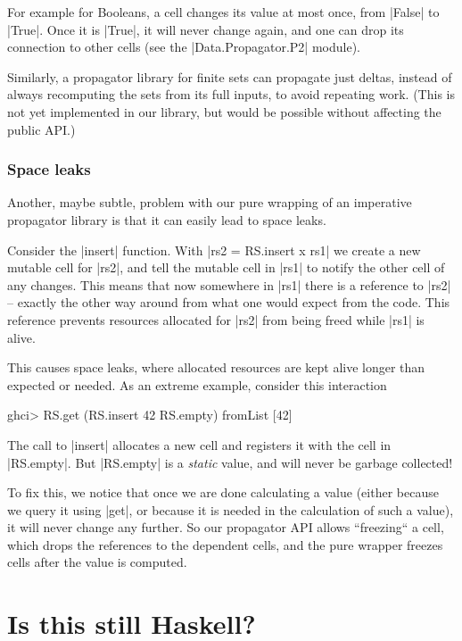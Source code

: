 \documentclass[manuscript,anonymous,screen,acmsmall]{acmart}
\begin{document}
For example for Booleans, a cell changes its value at most once, from |False| to |True|. Once it is |True|, it will never change again, and one can drop its connection to other cells (see the |Data.Propagator.P2| module).

Similarly, a propagator library for finite sets can propagate just deltas, instead of always recomputing the sets from its full inputs, to avoid repeating work. (This is not yet implemented in our library, but would be possible without affecting the public API.)

\subsubsection{Space leaks}\label{sec:spaceleak}

Another, maybe subtle, problem with our pure wrapping of an imperative propagator library is that it can easily lead to space leaks.

Consider the |insert| function. With |rs2 = RS.insert x rs1| we create a new mutable cell for |rs2|, and tell the mutable cell in |rs1| to notify the other cell of any changes. This means that now somewhere in |rs1| there is a reference to |rs2| -- exactly the other way around from what one would expect from the code. This reference prevents resources allocated for |rs2| from being freed while |rs1| is alive.

This causes space leaks, where allocated resources are kept alive longer than expected or needed. As an extreme example, consider this interaction
\begin{code}
ghci> RS.get (RS.insert 42 RS.empty)
fromList [42]
\end{code}
The call to |insert| allocates a new cell and registers it with the cell in |RS.empty|. But |RS.empty| is a \emph{static} value, and will never be garbage collected!

To fix this, we notice that once we are done calculating a value (either because we query it using |get|, or because it is needed in the calculation of such a value), it will never change any further. So our propagator API allows “freezing“ a cell, which drops the references to the dependent cells, and the pure wrapper freezes cells after the value is computed.

\section{Is this still Haskell?}\label{sec:pure}
\end{document}
